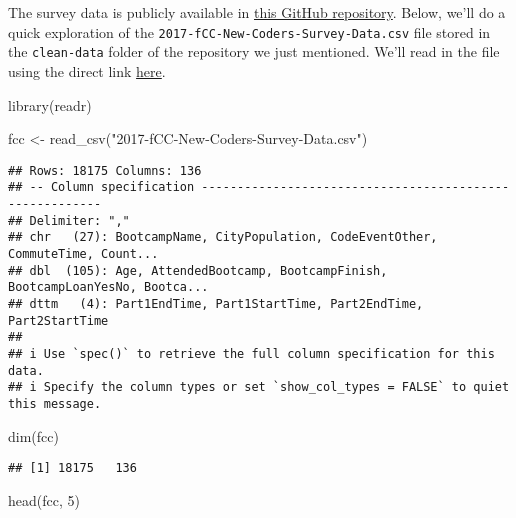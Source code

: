 \documentclass[
]{article}
\newenvironment{Shaded}{\begin{snugshade}}{\end{snugshade}}
\newcommand{\DecValTok}[1]{\textcolor[rgb]{0.00,0.00,0.81}{#1}}
\newcommand{\FunctionTok}[1]{\textcolor[rgb]{0.00,0.00,0.00}{#1}}
\newcommand{\NormalTok}[1]{#1}
\newcommand{\OtherTok}[1]{\textcolor[rgb]{0.56,0.35,0.01}{#1}}
\newcommand{\StringTok}[1]{\textcolor[rgb]{0.31,0.60,0.02}{#1}}
\begin{document}
The survey data is publicly available in
\href{https://github.com/freeCodeCamp/2017-new-coder-survey}{this GitHub
repository}. Below, we'll do a quick exploration of the
\texttt{2017-fCC-New-Coders-Survey-Data.csv} file stored in the
\texttt{clean-data} folder of the repository we just mentioned. We'll
read in the file using the direct link
\href{https://raw.githubusercontent.com/freeCodeCamp/2017-new-coder-survey/master/clean-data/2017-fCC-New-Coders-Survey-Data.csv}{here}.

\begin{Shaded}
\begin{Highlighting}[]
\FunctionTok{library}\NormalTok{(readr)}

\NormalTok{fcc }\OtherTok{\textless{}{-}} \FunctionTok{read\_csv}\NormalTok{(}\StringTok{"2017{-}fCC{-}New{-}Coders{-}Survey{-}Data.csv"}\NormalTok{)}
\end{Highlighting}
\end{Shaded}

\begin{verbatim}
## Rows: 18175 Columns: 136
## -- Column specification --------------------------------------------------------
## Delimiter: ","
## chr   (27): BootcampName, CityPopulation, CodeEventOther, CommuteTime, Count...
## dbl  (105): Age, AttendedBootcamp, BootcampFinish, BootcampLoanYesNo, Bootca...
## dttm   (4): Part1EndTime, Part1StartTime, Part2EndTime, Part2StartTime
## 
## i Use `spec()` to retrieve the full column specification for this data.
## i Specify the column types or set `show_col_types = FALSE` to quiet this message.
\end{verbatim}

\begin{Shaded}
\begin{Highlighting}[]
\FunctionTok{dim}\NormalTok{(fcc)}
\end{Highlighting}
\end{Shaded}

\begin{verbatim}
## [1] 18175   136
\end{verbatim}

\begin{Shaded}
\begin{Highlighting}[]
\FunctionTok{head}\NormalTok{(fcc, }\DecValTok{5}\NormalTok{)}
\end{Highlighting}
\end{Shaded}
\end{document}

